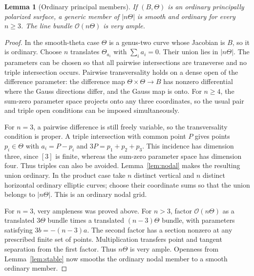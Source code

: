 \documentclass[11pt]{article}
\newtheorem{lemma}[theorem]{Lemma}
\theoremstyle{definition}\newtheorem{definition}[theorem]{Definition}
\theoremstyle{remark}\newtheorem{remark}[theorem]{Remark}
\newcommand{\OO}{\mathcal O}
\begin{document}
\begin{lemma}[Ordinary principal members]\label{lem:ordinary-principal}
If $(B,\Theta)$ is an ordinary principally polarized surface, a generic member of $|n\Theta|$ is smooth and ordinary for every $n\ge3$. The line bundle $\OO(n\Theta)$ is very ample.
\end{lemma}
\begin{proof}
In the smooth-theta case $\Theta$ is a genus-two curve whose Jacobian is $B$, so it is ordinary. Choose $n$ translates $\Theta_{a_i}$ with $\sum_i a_i=0$. Their union lies in $|n\Theta|$. The parameters can be chosen so that all pairwise intersections are transverse and no triple intersection occurs. Pairwise transversality holds on a dense open of the difference parameter: the difference map $\Theta\times\Theta\to B$ has nonzero differential where the Gauss directions differ, and the Gauss map is onto. For $n\ge4$, the sum-zero parameter space projects onto any three coordinates, so the usual pair and triple open conditions can be imposed simultaneously.

For $n=3$, a pairwise difference is still freely variable, so the transversality condition is proper. A triple intersection with common point $P$ gives points $p_i\in\Theta$ with $a_i=P-p_i$ and $3P=p_1+p_2+p_3$. This incidence has dimension three, since $[3]$ is finite, whereas the sum-zero parameter space has dimension four. Thus triples can also be avoided. Lemma~\ref{lem:nodal} makes the resulting union ordinary. In the product case take $n$ distinct vertical and $n$ distinct horizontal ordinary elliptic curves; choose their coordinate sums so that the union belongs to $|n\Theta|$. This is an ordinary nodal grid.

For $n=3$, very ampleness was proved above. For $n>3$, factor $\OO(n\Theta)$ as a translated $3\Theta$ bundle times a translated $(n-3)\Theta$ bundle, with parameters satisfying $3b=-(n-3)a$. The second factor has a section nonzero at any prescribed finite set of points. Multiplication transfers point and tangent separation from the first factor. Thus $n\Theta$ is very ample. Openness from Lemma~\ref{lem:stable} now smooths the ordinary nodal member to a smooth ordinary member.
\end{proof}
\end{document}
